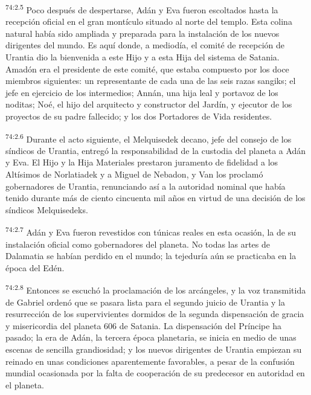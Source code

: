 \par
\textsuperscript{74:2.5} Poco después de despertarse, Adán y Eva fueron escoltados hasta la recepción oficial en el gran montículo situado al norte del templo. Esta colina natural había sido ampliada y preparada para la instalación de los nuevos dirigentes del mundo. Es aquí donde, a mediodía, el comité de recepción de Urantia dio la bienvenida a este Hijo y a esta Hija del sistema de Satania. Amadón era el presidente de este comité, que estaba compuesto por los doce miembros siguientes: un representante de cada una de las seis razas sangiks; el jefe en ejercicio de los intermedios; Annán, una hija leal y portavoz de los noditas; Noé, el hijo del arquitecto y constructor del Jardín, y ejecutor de los proyectos de su padre fallecido; y los dos Portadores de Vida residentes.

\par
\textsuperscript{74:2.6} Durante el acto siguiente, el Melquisedek decano, jefe del consejo de los síndicos de Urantia, entregó la responsabilidad de la custodia del planeta a Adán y Eva. El Hijo y la Hija Materiales prestaron juramento de fidelidad a los Altísimos de Norlatiadek y a Miguel de Nebadon, y Van los proclamó gobernadores de Urantia, renunciando así a la autoridad nominal que había tenido durante más de ciento cincuenta mil años en virtud de una decisión de los síndicos Melquisedeks.

\par
\textsuperscript{74:2.7} Adán y Eva fueron revestidos con túnicas reales en esta ocasión, la de su instalación oficial como gobernadores del planeta. No todas las artes de Dalamatia se habían perdido en el mundo; la tejeduría aún se practicaba en la época del Edén.

\par
\textsuperscript{74:2.8} Entonces se escuchó la proclamación de los arcángeles, y la voz transmitida de Gabriel ordenó que se pasara lista para el segundo juicio de Urantia y la resurrección de los supervivientes dormidos de la segunda dispensación de gracia y misericordia del planeta 606 de Satania. La dispensación del Príncipe ha pasado; la era de Adán, la tercera época planetaria, se inicia en medio de unas escenas de sencilla grandiosidad; y los nuevos dirigentes de Urantia empiezan su reinado en unas condiciones aparentemente favorables, a pesar de la confusión mundial ocasionada por la falta de cooperación de su predecesor en autoridad en el planeta.

